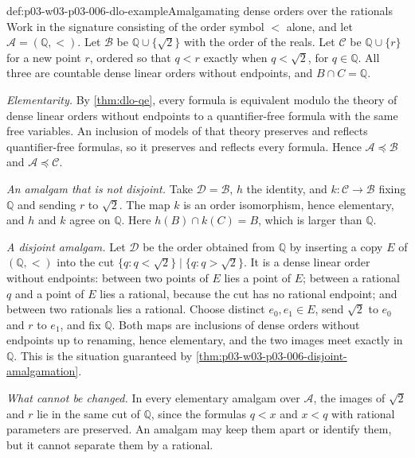 \begin{hbexample}{def:p03-w03-p03-006-dlo-example}{Amalgamating dense orders over the rationals}
Work in the signature consisting of the order symbol \(<\) alone, and
let \(\mathcal A=(\mathbb Q,<)\).  Let
\(\mathcal B\) be \(\mathbb Q\cup\{\sqrt2\}\) with the order of the reals.
Let \(\mathcal C\) be \(\mathbb Q\cup\{r\}\) for a new point \(r\), ordered
so that \(q<r\) exactly when \(q<\sqrt2\), for \(q\in\mathbb Q\).  All three
are countable dense linear orders without endpoints, and
\(B\cap C=\mathbb Q\).

\emph{Elementarity.}  By \cref{thm:dlo-qe}, every formula is equivalent
modulo the theory of dense linear orders without endpoints to a
quantifier-free formula with the same free variables.  An inclusion of
models of that theory preserves and reflects quantifier-free formulas, so it
preserves and reflects every formula.  Hence
\(\mathcal A\preccurlyeq\mathcal B\) and \(\mathcal A\preccurlyeq\mathcal C\).

\emph{An amalgam that is not disjoint.}  Take \(\mathcal D=\mathcal B\),
\(h\) the identity, and \(k:\mathcal C\to\mathcal B\) fixing \(\mathbb Q\)
and sending \(r\) to \(\sqrt2\).  The map \(k\) is an order isomorphism,
hence elementary, and \(h\) and \(k\) agree on \(\mathbb Q\).  Here
\(h(B)\cap k(C)=B\), which is larger than \(\mathbb Q\).

\emph{A disjoint amalgam.}  Let \(\mathcal D\) be the order obtained from
\(\mathbb Q\) by inserting a copy \(E\) of \((\mathbb Q,<)\) into the cut
\(\{q:q<\sqrt2\}\mid\{q:q>\sqrt2\}\).  It is a dense linear order without
endpoints: between two points of \(E\) lies a point of \(E\); between a
rational \(q\) and a point of \(E\) lies a rational, because the cut has no
rational endpoint; and between two rationals lies a rational.  Choose
distinct \(e_0,e_1\in E\), send \(\sqrt2\) to \(e_0\) and \(r\) to
\(e_1\), and fix \(\mathbb Q\).  Both maps are inclusions of dense orders
without endpoints up to renaming, hence elementary, and the two images
meet exactly in \(\mathbb Q\).  This is the situation guaranteed by
\cref{thm:p03-w03-p03-006-disjoint-amalgamation}.

\emph{What cannot be changed.}  In every elementary amalgam over
\(\mathcal A\), the images of \(\sqrt2\) and \(r\) lie in the same cut of
\(\mathbb Q\), since the formulas \(q<x\) and \(x<q\) with rational
parameters are preserved.  An amalgam may keep them apart or identify them,
but it cannot separate them by a rational.
\end{hbexample}

